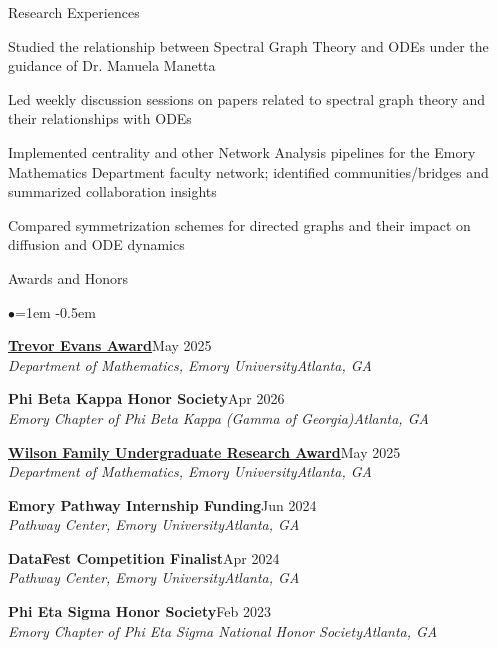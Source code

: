 \documentclass[10pt, letterpaper]{resume} %
\begin{document}
\begin{rSection}{Research Experiences}
\begin{rSubsection}
	\item Studied the relationship between Spectral Graph Theory and  ODEs under the guidance of Dr. Manuela Manetta
	\item Led weekly discussion sessions on papers related to spectral graph theory and their relationships with ODEs 
	\item Implemented centrality and other Network Analysis pipelines for the Emory Mathematics Department faculty network; identified communities/bridges and summarized collaboration insights
	\item Compared symmetrization schemes for directed graphs and their impact on diffusion and ODE dynamics
\end{rSubsection}
\end{rSection} 

\begin{rSection}{Awards and Honors}
\begin{list}{$\bullet$}{\leftmargin=1em}
   \itemsep -0.5em
\item \textbf{\href{https://mathematics.emory.edu/undergraduate/awards.html\#row2}{Trevor Evans Award}}\hfill{May 2025}\\\textit{Department of Mathematics, Emory University}\hfill\textit{Atlanta, GA}
\item \textbf{Phi Beta Kappa Honor Society}\hfill{Apr 2026}\\
\textit{Emory Chapter of Phi Beta Kappa (Gamma of Georgia)}\hfill\textit{Atlanta, GA}
\item \textbf{\href{https://mathematics.emory.edu/undergraduate/awards.html\#row1}{Wilson Family Undergraduate Research Award}}\hfill{May 2025}\\
\textit{Department of Mathematics, Emory University}\hfill\textit{Atlanta, GA}
\item \textbf{Emory Pathway Internship Funding}\hfill{Jun 2024}\\\textit{Pathway Center, Emory University}\hfill\textit{Atlanta, GA}
\item \textbf{DataFest Competition Finalist}\hfill{Apr 2024}\\\textit{Pathway Center, Emory University}\hfill\textit{Atlanta, GA}
\item \textbf{Phi Eta Sigma Honor Society}\hfill{Feb 2023}\\\textit{Emory Chapter of Phi Eta Sigma National Honor Society}\hfill\textit{Atlanta, GA}
\end{list}
\end{rSection} 
\end{document}
